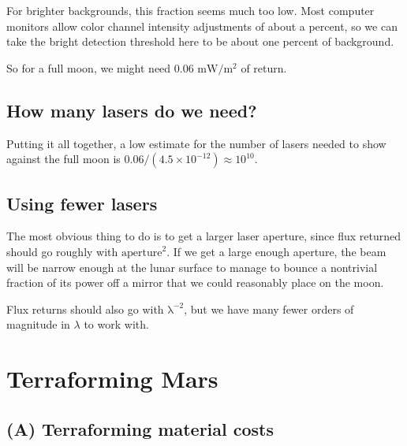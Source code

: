 \documentclass[12pt]{article}
\begin{document}
For brighter backgrounds, this fraction seems much too low. Most computer monitors allow color channel intensity adjustments of about a percent, so we can take the bright detection threshold here to be about one percent of background.



So for a full moon, we might need 0.06 \(\mathrm{ mW}/\mathrm{m^2}\) of return.

\subsection{How many lasers do we need?}

Putting it all together, a low estimate for the number of lasers needed to show against the full moon is \(0.06 / (4.5\times 10^{-12}) \approx 10^{10}\).


\subsection{Using fewer lasers}

The most obvious thing to do is to get a larger laser aperture, since flux returned should go roughly with \( \mathrm{aperture}^{2}\). If we get a large enough aperture, the beam will be narrow enough at the lunar surface to manage to bounce a nontrivial fraction of its power off a mirror that we could reasonably place on the moon.

Flux returns should also go with \(\mathrm{\lambda}^{-2}\), but we have many fewer orders of magnitude in \(\lambda\) to work with. 


\section{Terraforming Mars}

\subsection{(A) Terraforming material costs}
\end{document}
